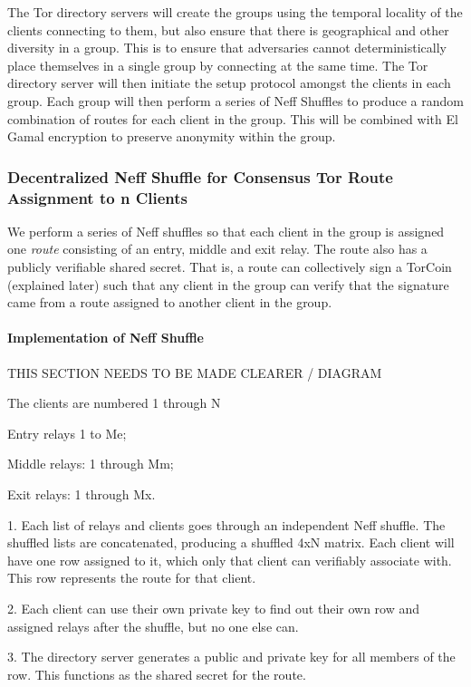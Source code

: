 The Tor directory servers will create the groups using the temporal locality of the clients connecting to them, but also ensure that there is geographical and other diversity in a group. This is to ensure that adversaries cannot deterministically place themselves in a single group by connecting at the same time.
The Tor directory server will then initiate the setup protocol amongst the clients in each group. Each group will then perform a series of Neff Shuffles to produce a random combination of routes for each client in the group. This will be combined with El Gamal encryption to preserve anonymity within the group.

\subsubsection{Decentralized Neff Shuffle for Consensus Tor Route Assignment to n Clients}
We perform a series of Neff shuffles so that each client in the group is assigned one \textit{route} consisting of an entry, middle and exit relay. The route also has a publicly verifiable shared secret. That is, a route can collectively sign a TorCoin (explained later) such that any client in the group can verify that the signature came from a route assigned to another client in the group.

\paragraph{Implementation of Neff Shuffle}

THIS SECTION NEEDS TO BE MADE CLEARER / DIAGRAM

The clients are numbered 1 through N

Entry relays 1 to Me; 

Middle relays: 1 through Mm; 

Exit relays: 1 through Mx.

1.  Each list of relays and clients goes through an independent Neff shuffle. The shuffled lists are concatenated, producing a shuffled 4xN matrix. Each client will have one row assigned to it, which only that client can verifiably associate with. This row represents the route for that client.

2.  Each client can use their own private key to find out their own row and assigned relays after the shuffle, but no one else can.

3.  The directory server generates a public and private key for all members of the row. This functions as the shared secret for the route.

